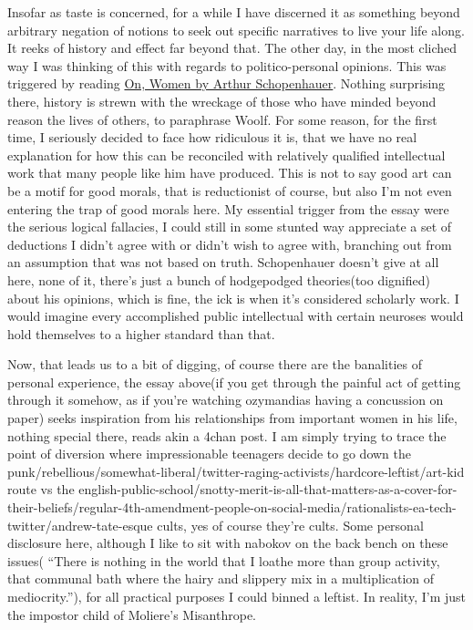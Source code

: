 \noindent {}

Insofar as taste is concerned, for a while I have discerned it as something beyond arbitrary negation of notions to seek out specific narratives to live your life along. It reeks of history and effect far beyond that. The other day, in the most cliched way I was thinking of this with regards to politico-personal opinions. This was triggered by reading \href{https://en.wikisource.org/wiki/Studies_in_Pessimism/On_Women}{On, Women by Arthur Schopenhauer}. Nothing surprising there, history is strewn with the wreckage of those who have minded beyond reason the lives of others, to paraphrase Woolf. For some reason, for the first time, I seriously decided to face how ridiculous it is, that we have no real explanation for how this can be reconciled with relatively qualified intellectual work that many people like him have produced. This is not to say good art can be a motif for good morals, that is reductionist of course, but also I'm not even entering the trap of good morals here. My essential trigger from the essay were the serious logical fallacies, I could still in some stunted way appreciate a set of deductions I didn't agree with or didn't wish to agree with, branching out from an assumption that was not based on truth. Schopenhauer doesn't give at all here, none of it, there's just a bunch of hodgepodged theories(too dignified) about his opinions, which is fine, the ick is when it's considered scholarly work. I would imagine every accomplished public intellectual with certain neuroses would hold themselves to a higher standard than that. 

Now, that leads us to a bit of digging, of course there are the banalities of personal experience, the essay above(if you get through the painful act of getting through it somehow, as if you're watching ozymandias having a concussion on paper) seeks inspiration from his relationships from important women in his life, nothing special there, reads akin a 4chan post. I am simply trying to trace the point of diversion where impressionable teenagers decide to go down the punk/rebellious/somewhat-liberal/twitter-raging-activists/hardcore-leftist/art-kid route vs the english-public-school/snotty-merit-is-all-that-matters-as-a-cover-for-their-beliefs/regular-4th-amendment-people-on-social-media/rationalists-ea-tech-twitter/andrew-tate-esque cults, yes of course they're cults. Some personal disclosure here, although I like to sit with nabokov on the back bench on these issues(
“There is nothing in the world that I loathe more than group activity, that communal bath where the hairy and slippery mix in a multiplication of mediocrity.”), for all practical purposes I could binned a leftist. In reality, I'm just the impostor child of Moliere's Misanthrope. 

